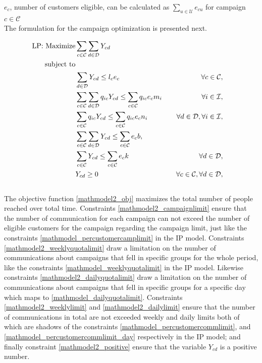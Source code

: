 \documentclass[11pt]{article}
\begin{document}
\noindent $e_{c}$, number of customers eligible, can be calculated as $\sum\limits_{u\in\mathcal{U}}e_{{c}{u}}$ for campaign $c \in \mathcal{C}$\\

\noindent The formulation for the campaign optimization is presented next.

\begin{align}
\text{LP: }\text{Maximize} & \displaystyle
\sum\limits_{c\in \mathcal{C}}
\sum\limits_{d\in \mathcal{D}}
Y_{{c}{d}} \label{mathmodel2_obj}&
\\
\text{subject to} \notag\\
&\sum\limits_{d\in\mathcal{D}}Y_{{c}{d}} \leq l_{c}  e_{c} &&&\forall c \in \mathcal{C}, \label{mathmodel2_campaignlimit}&\\
&\sum\limits_{c\in\mathcal{C}}\sum\limits_{d\in\mathcal{D}} q_{{i}{c}} Y_{{c}{d}}\leq \sum\limits_{c\in\mathcal{C}}q_{{i}{c}} e_{c}  m_{i} &&&\forall i \in \mathcal{I}, \label{mathmodel2_weeklyquotalimit}&\\
&\sum\limits_{c\in\mathcal{C}}q_{{i}{c}} Y_{{c}{d}} \leq \sum\limits_{c\in\mathcal{C}}q_{{i}{c}} e_{c} n_{i} &&&\forall d \in \mathcal{D}, \forall i \in \mathcal{I}, \label{mathmodel2_dailyquotalimit}&\\
&\sum\limits_{c\in\mathcal{C}}\sum\limits_{d\in\mathcal{D}}Y_{{c}{d}} \leq \sum\limits_{c\in\mathcal{C}}e_{c}  b, \label{mathmodel2_weeklylimit}&\\
&\sum\limits_{c\in\mathcal{C}}Y_{{c}{d}} \leq \sum\limits_{c\in\mathcal{C}}e_{c} k &&&\forall d \in \mathcal{D},\label{mathmodel2_dailylimit}&\\
&Y_{{c}{d}} \geq 0&&&\forall c \in \mathcal{C}, \forall d \in \mathcal{D}, \label{mathmodel2_positive}
\end{align}\\

The objective function \eqref{mathmodel2_obj} maximizes the total number of people reached over total time. Constraints \eqref{mathmodel2_campaignlimit} ensure that the number of communication for each campaign can not exceed the number of eligible customers for the campaign regarding the campaign limit, just like the constraints \eqref{mathmodel_percustomercamplimit} in the IP model. Constraints \eqref{mathmodel2_weeklyquotalimit} draw a limitation on the number of communications about campaigns that fell in specific groups for the whole period, like the constraints \eqref{mathmodel_weeklyquotalimit} in the IP model. Likewise constraints \eqref{mathmodel2_dailyquotalimit} draw a limitation on the number of communications about campaigns that fell in specific groups for a specific day which maps to \eqref{mathmodel_dailyquotalimit}. Constraints \eqref{mathmodel2_weeklylimit} and \eqref{mathmodel2_dailylimit} ensure that the number of communications in total are not exceeded weekly and daily limits both of which are shadows of the constraints \eqref{mathmodel_percustomercommlimit}, and \eqref{mathmodel_percustomercommlimit_day} respectively in the IP model; and finally constraint \eqref{mathmodel2_positive} ensure that the variable $Y_{{c}{d}}$ is a positive number.\\
\end{document}
